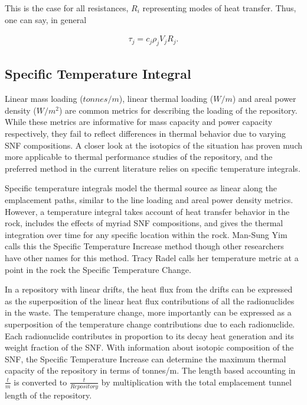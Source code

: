 This is the case for all resistances, $R_i$ 
representing modes of heat transfer. Thus, one can say, in general

\begin{align}
  \tau_j = c_j \rho_j V_j R_j.
\end{align}

\subsection{Specific Temperature Integral}

Linear mass loading ($tonnes/m$), linear thermal loading ($W/m$) and areal power 
density ($W/m^2$) are common metrics
for describing the loading of the repository. While these metrics are
informative for mass capacity and power capacity respectively, they fail to
reflect differences in thermal behavior due to varying SNF compositions.  A
closer look at the isotopics of the situation has proven much more applicable
to thermal performance studies of the repository, and the preferred method in
the current literature relies on specific temperature integrals.


Specific temperature integrals model the thermal source as linear along the
emplacement paths, similar to the line loading and areal power density metrics.
However, a temperature integral takes account of heat transfer behavior in the
rock, includes the effects of myriad SNF compositions, and gives the thermal
integration over time for any specific location within the rock.  Man-Sung Yim
calls this the Specific Temperature Increase method\cite{li_specific_2008}
though other researchers have other names for this method. Tracy Radel calls
her temperature metric at a point in the rock the Specific Temperature
Change\cite{radel_repository_2007}.

In a repository with linear drifts, the heat flux from the drifts can be
expressed as the superposition of the linear heat flux contributions of all the
radionuclides in the waste. The temperature change, more importantly can be 
expressed as a superposition of the temperature change contributions due to  
each radionuclide. Each radionuclide contributes in proportion to its
decay heat generation and its weight fraction of the SNF. With information
about isotopic composition of the SNF, the Specific Temperature Increase can
determine the maximum thermal capacity of the repository in terms of tonnes/m.
The length based accounting in $\frac{t}{m}$ is converted to
$\frac{t}{Repository}$ by multiplication with the total emplacement tunnel
length of the repository. 

